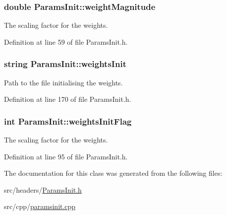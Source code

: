 \subsubsection[{\texorpdfstring{weight\+Magnitude}{weightMagnitude}}]{\setlength{\rightskip}{0pt plus 5cm}double Params\+Init\+::weight\+Magnitude}\hypertarget{classParamsInit_a2258ae5b7eb9489ca58421ac674e012b}{}\label{classParamsInit_a2258ae5b7eb9489ca58421ac674e012b}


The scaling factor for the weights. 



Definition at line 59 of file Params\+Init.\+h.

\subsubsection[{\texorpdfstring{weights\+Init}{weightsInit}}]{\setlength{\rightskip}{0pt plus 5cm}string Params\+Init\+::weights\+Init}\hypertarget{classParamsInit_a88906d27914ea5df98f5f997de2f3b0a}{}\label{classParamsInit_a88906d27914ea5df98f5f997de2f3b0a}


Path to the file initialising the weights. 



Definition at line 170 of file Params\+Init.\+h.

\subsubsection[{\texorpdfstring{weights\+Init\+Flag}{weightsInitFlag}}]{\setlength{\rightskip}{0pt plus 5cm}int Params\+Init\+::weights\+Init\+Flag}\hypertarget{classParamsInit_a1ba43becf89da7f807f84f9bf6edf1a3}{}\label{classParamsInit_a1ba43becf89da7f807f84f9bf6edf1a3}


The scaling factor for the weights. 



Definition at line 95 of file Params\+Init.\+h.



The documentation for this class was generated from the following files\+:\begin{DoxyCompactItemize}
\item 
src/headers/\hyperlink{ParamsInit_8h}{Params\+Init.\+h}\item 
src/cpp/\hyperlink{paramsinit_8cpp}{paramsinit.\+cpp}\end{DoxyCompactItemize}
